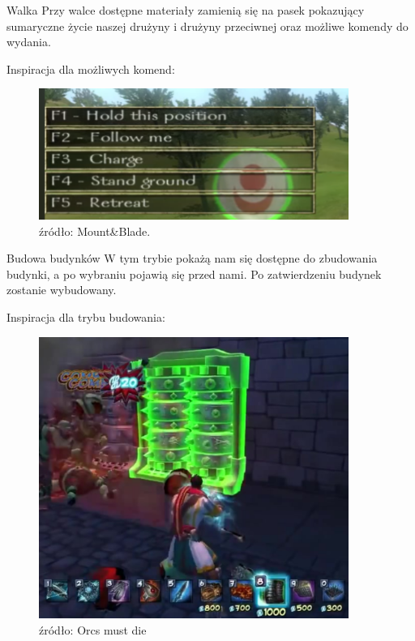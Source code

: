 Walka
Przy walce dostępne materiały zamienią się na pasek pokazujący sumaryczne życie naszej drużyny i drużyny przeciwnej oraz możliwe komendy do wydania.

Inspiracja dla możliwych komend:
\begin{figure}[htbp]
    \centering
    \includegraphics[width=0.9\textwidth]{images/ui/commandsMountBla.png}
    \caption{źródło: Mount&Blade.}\label{fig:MountnBlade}
\end{figure}


Budowa budynków
W tym trybie pokażą nam się dostępne do zbudowania budynki, a po wybraniu pojawią się przed nami. Po zatwierdzeniu budynek zostanie wybudowany.

Inspiracja dla trybu budowania:
\begin{figure}[htbp]
    \centering
    \includegraphics[width=0.9\textwidth]{images/ui/buoildingsOrcs.png}
    \caption{źródło: Orcs must die}\label{fig:Orcs}
\end{figure}

